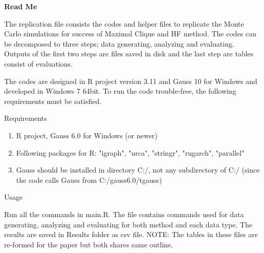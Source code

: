 \documentclass{article}
\begin{document}
\begin{center}
	\Large \bf Read Me 
\end{center}
The replication file consists the codes and helper files to replicate the Monte Carlo simulations for success of Maximal Clique and HF method. The codes can be decomposed to three steps; data generating, analyzing and evaluating. Outputs of the first two steps are files saved in disk and the last step are tables consist of evaluations.

The codes are designed in R project version 3.11 and Gauss 10 for Windows and developed in Windows 7 64bit. To run the code trouble-free, the following requirements must be satisfied.
\begin{flushleft}
	\large Requirements
\end{flushleft}
\begin{enumerate}
\item R project, Gauss 6.0 for Windows (or newer)
\item Following packages for R: "igraph", "urca", "stringr", "rugarch", "parallel"
\item Gauss should be installed in directory C:/, not any subdirectory of C:/ (since the code calls Gauss from C:/gauss6.0/tgauss)

\end{enumerate}

\begin{flushleft}
	\large Usage
\end{flushleft}
Run all the commands in main.R. The file contains commands used for data generating, analyzing and evaluating for both method and each data type. The results are saved in Results folder as csv file. NOTE: The tables in these files are re-formed for the paper but both shares same outline.
\end{document}

